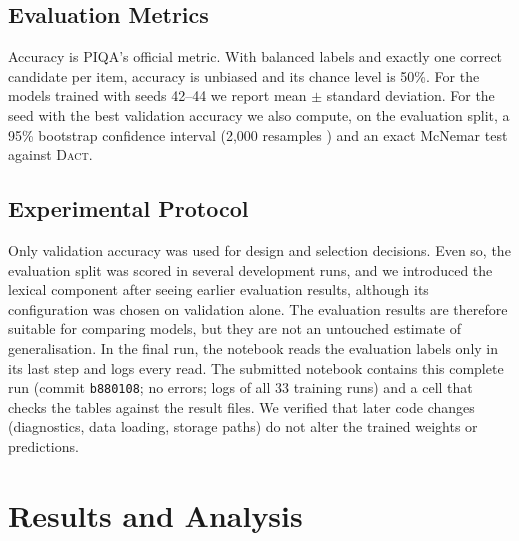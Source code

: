 \documentclass[11pt]{article}
\newcommand{\dact}{\textsc{Dact}}
\begin{document}
\subsection{Evaluation Metrics}
Accuracy is PIQA's official metric. With balanced labels and exactly one correct candidate per item, accuracy is unbiased and its chance level is 50\%. For the models trained with seeds 42--44 we report mean $\pm$ standard deviation. For the seed with the best validation accuracy we also compute, on the evaluation split, a 95\% bootstrap confidence interval (2{,}000 resamples \cite{efron1993bootstrap}) and an exact McNemar test \cite{mcnemar1947note} against \dact{}.

\subsection{Experimental Protocol}\label{sec:protocol}
Only validation accuracy was used for design and selection decisions. Even so, the evaluation split was scored in several development runs, and we introduced the lexical component after seeing earlier evaluation results, although its configuration was chosen on validation alone. The evaluation results are therefore suitable for comparing models, but they are not an untouched estimate of generalisation. In the final run, the notebook reads the evaluation labels only in its last step and logs every read. The submitted notebook contains this complete run (commit \texttt{b880108}; no errors; logs of all 33 training runs) and a cell that checks the tables against the result files. We verified that later code changes (diagnostics, data loading, storage paths) do not alter the trained weights or predictions.

\section{Results and Analysis}
\end{document}
